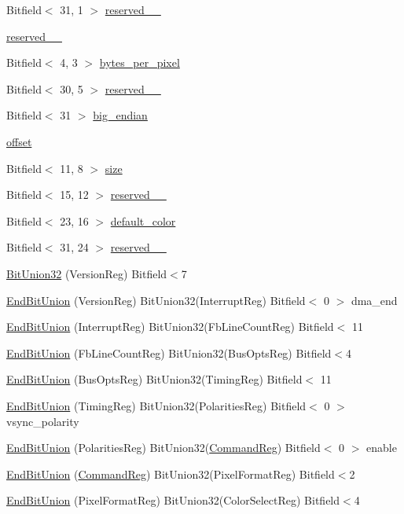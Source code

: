 \begin{DoxyCompactItemize}
\item 
Bitfield$<$ 31, 1 $>$ \hyperlink{classHDLcd_a8b3d3dd450f66100b4fc3ee67662400f}{reserved\_\_}
\item 
\hyperlink{classHDLcd_ad1c96f2932104796b8b9c1dced5ea441}{reserved\_\_}
\item 
Bitfield$<$ 4, 3 $>$ \hyperlink{classHDLcd_a6d40f0125f53451c936adc705f608a2b}{bytes\_\-per\_\-pixel}
\item 
Bitfield$<$ 30, 5 $>$ \hyperlink{classHDLcd_ac7a399166fd9782945b54c1218b6aa3f}{reserved\_\_}
\item 
Bitfield$<$ 31 $>$ \hyperlink{classHDLcd_adba5c1ae8473b445f9be0125676b2852}{big\_\-endian}
\item 
\hyperlink{classHDLcd_a7a229a4786deeddd59c6091247a8c8a6}{offset}
\item 
Bitfield$<$ 11, 8 $>$ \hyperlink{classHDLcd_a9165522b50dc058c1a097ae26260fc61}{size}
\item 
Bitfield$<$ 15, 12 $>$ \hyperlink{classHDLcd_aead24f2eb2742ac7708882a7d9616412}{reserved\_\_}
\item 
Bitfield$<$ 23, 16 $>$ \hyperlink{classHDLcd_a8ff8f961eef85324f222954cc8ba53ee}{default\_\-color}
\item 
Bitfield$<$ 31, 24 $>$ \hyperlink{classHDLcd_a55b96b8eb8acba57e5ed38854674db7e}{reserved\_\_}
\item 
\hyperlink{classHDLcd_aec6571bbae7a34d8f4acc94770b38fad}{BitUnion32} (VersionReg) Bitfield$<$7
\item 
\hyperlink{classHDLcd_ae86db13e164e3134cde1780b881b5a2b}{EndBitUnion} (VersionReg) BitUnion32(InterruptReg) Bitfield$<$ 0 $>$ dma\_\-end
\item 
\hyperlink{classHDLcd_aab67db2435979ade75800819a6694c70}{EndBitUnion} (InterruptReg) BitUnion32(FbLineCountReg) Bitfield$<$ 11
\item 
\hyperlink{classHDLcd_aea5d211b3a25fc73ea615aef16360155}{EndBitUnion} (FbLineCountReg) BitUnion32(BusOptsReg) Bitfield$<$4
\item 
\hyperlink{classHDLcd_a6d14e80c9f7e2901c07bcb2971c9128f}{EndBitUnion} (BusOptsReg) BitUnion32(TimingReg) Bitfield$<$ 11
\item 
\hyperlink{classHDLcd_a77fc9b81e2f21847dd26ae5dfa7e7e2f}{EndBitUnion} (TimingReg) BitUnion32(PolaritiesReg) Bitfield$<$ 0 $>$ vsync\_\-polarity
\item 
\hyperlink{classHDLcd_a15872640ef504c5434a0d6d2f8d1370f}{EndBitUnion} (PolaritiesReg) BitUnion32(\hyperlink{structCommandReg}{CommandReg}) Bitfield$<$ 0 $>$ enable
\item 
\hyperlink{classHDLcd_ad18895590b07f37749435b9fcab06a1b}{EndBitUnion} (\hyperlink{structCommandReg}{CommandReg}) BitUnion32(PixelFormatReg) Bitfield$<$2
\item 
\hyperlink{classHDLcd_af0dba6bcb7a2dfa9fffb850df381fb35}{EndBitUnion} (PixelFormatReg) BitUnion32(ColorSelectReg) Bitfield$<$4
\end{DoxyCompactItemize}


